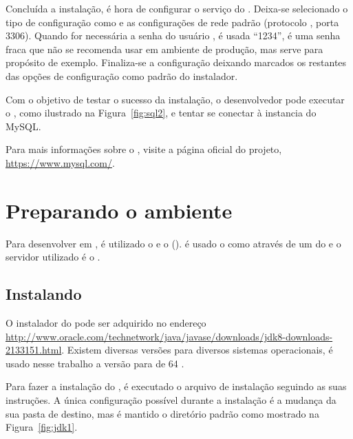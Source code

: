 
Concluída a instalação, é hora de configurar o serviço do . Deixa-se selecionado o tipo de configuração como  e as configurações de rede padrão (protocolo , porta 3306). Quando for necessária a senha do usuário , é usada “1234”, é uma senha fraca que não se recomenda usar em ambiente de produção, mas serve para propósito de exemplo. Finaliza-se a configuração deixando marcados os restantes das opções de configuração como padrão do instalador.

Com o objetivo de testar o sucesso da instalação, o desenvolvedor pode executar o , como ilustrado na Figura~\ref{fig:sql2}, e tentar se conectar à instancia do MySQL.


Para mais informações sobre o , visite a página oficial do projeto, \url{https://www.mysql.com/}.

\section{Preparando o ambiente }

Para desenvolver em , é utilizado o  e o  (). é usado o  como  através de um  do  e o servidor  utilizado é o .

\subsection{Instalando }

O instalador do  pode ser adquirido no endereço \url{http://www.oracle.com/technetwork/java/javase/downloads/jdk8-downloads-2133151.html}. Existem diversas versões para diversos sistemas operacionais, é usado nesse trabalho a versão para  de 64 . 

Para fazer a instalação do , é executado o arquivo de instalação seguindo as suas instruções. A única configuração possível durante a instalação é a mudança da sua pasta de destino, mas é mantido o diretório padrão como mostrado na Figura~\ref{fig:jdk1}.


